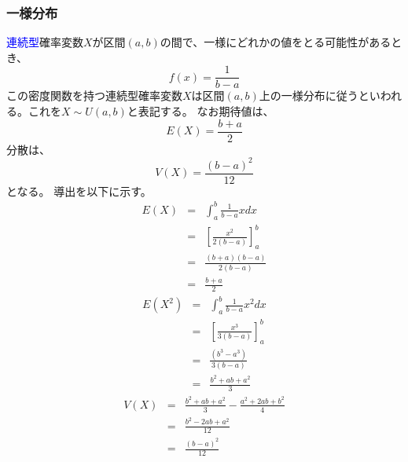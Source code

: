 \documentclass[a4paper,10pt]{jarticle}
\begin{document}
\subsubsection{一様分布}
\textcolor{blue}{連続型}確率変数$X$が区間$(a,b)$の間で、一様にどれかの値をとる可能性があるとき、
\begin{equation}
    f(x)=\frac{1}{b-a}\tag{3,14}
\end{equation}
この密度関数を持つ連続型確率変数$X$は区間$(a,b)$上の一様分布に従うといわれる。これを$X\sim U(a,b)$と表記する。
なお期待値は、
\begin{equation}
    E(X)=\frac{b+a}{2}\tag{3,15}
\end{equation}
分散は、
\begin{equation}
    V(X)=\frac{(b-a)^2}{12}\tag{3,16}
\end{equation}
となる。
導出を以下に示す。
\begin{eqnarray*}
    E(X) &=& \int_a^b \frac{1}{b-a}xdx\\
        &=& \left[\frac{x^2}{2(b-a)}\right]_a^b\\
        &=& \frac{(b+a)(b-a)}{2(b-a)}\\
        &=& \frac{b+a}{2}
\end{eqnarray*}
\begin{eqnarray*}
    E(X^2) &=& \int_a^b \frac{1}{b-a}x^2dx\\
    &=& \left[\frac{x^3}{3(b-a)}\right]_a^b\\
    &=& \frac{(b^3-a^3)}{3(b-a)}\\
    &=& \frac{b^2+ab+a^2}{3}
\end{eqnarray*}
\begin{eqnarray*}
    V(X) &=& \frac{b^2+ab+a^2}{3}-\frac{a^2+2ab+b^2}{4}\\
    &=& \frac{b^2-2ab+a^2}{12}\\
    &=& \frac{(b-a)^2}{12}
\end{eqnarray*}
\end{document}
